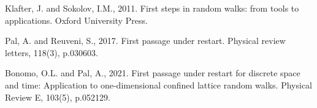 \documentclass[showpacs,amsmath,amssymb,aps,pre,twocolumn]{revtex4-1}
\begin{document}





 \begin{thebibliography}{1}
 
 
 Klafter, J. and Sokolov, I.M., 2011. First steps in random walks: from tools to applications. Oxford University Press.

 Pal, A. and Reuveni, S., 2017. First passage under restart. Physical review letters, 118(3), p.030603.

 Bonomo, O.L. and Pal, A., 2021. First passage under restart for discrete space and time: Application to one-dimensional confined lattice random walks. Physical Review E, 103(5), p.052129.












\end{thebibliography}
 
\end{document}
